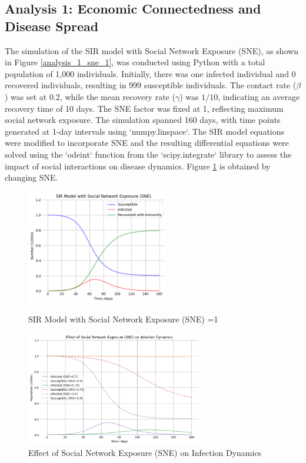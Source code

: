 \documentclass[9 pt]{article} %
\begin{document}
\subsection{Analysis 1: Economic Connectedness and Disease Spread}

The simulation of the SIR model with Social Network Exposure (SNE), as shown in Figure \ref{analysis_1_sne_1}, was conducted using Python with a total population of 1,000 individuals. Initially, there was one infected individual and 0 recovered individuals, resulting in 999 susceptible individuals. The contact rate (\(\beta\)) was set at 0.2, while the mean recovery rate (\(\gamma\)) was \(1/10\), indicating an average recovery time of 10 days. The SNE factor was fixed at 1, reflecting maximum social network exposure. The simulation spanned 160 days, with time points generated at 1-day intervals using `numpy.linspace`. The SIR model equations were modified to incorporate SNE and the resulting differential equations were solved using the `odeint` function from the `scipy.integrate` library to assess the impact of social interactions on disease dynamics. Figure \ref{analysis_1_sne_change} is obtained by changing SNE. 

\begin{figure}[h]
    \centering
    \begin{minipage}[t]{0.45\textwidth}
        \centering
        \includegraphics[height=5cm]{Figures/SNE_1_analysis_1.png}
        \caption{SIR Model with Social Network Exposure (SNE) =1}
        \label{analysis_1_sne_1}
    \end{minipage}
    \hspace{0.05\textwidth}
    \begin{minipage}[t]{0.45\textwidth}
        \centering
        \includegraphics[height=5cm]{Figures/changing_SNE_Analysis_1.png}
        \caption{Effect of Social Network Exposure (SNE) on Infection Dynamics}
        \label{analysis_1_sne_change}
    \end{minipage}
\end{figure}
\end{document}

